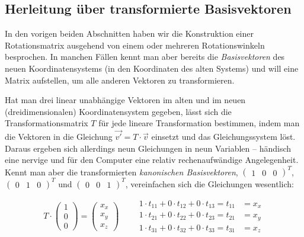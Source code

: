 \subsection{Herleitung über transformierte Basisvektoren}
\label{rotationbasevectors}
In den vorigen beiden Abschnitten haben wir die Konstruktion einer Rotationsmatrix ausgehend von einem oder mehreren Rotationswinkeln besprochen. In manchen Fällen kennt man aber bereits die \emph{Basisvektoren} des neuen Koordinatensystems (in den Koordinaten des alten Systems) und will eine Matrix aufstellen, um alle anderen Vektoren zu transformieren.

Hat man drei linear unabhängige Vektoren im alten und im neuen (dreidimensionalen) Koordinatensystem gegeben, lässt sich die Transformationsmatrix $T$ für jede lineare Transformation bestimmen, indem man die Vektoren in die Gleichung $\vec{v'} = T \cdot \vec v$ einsetzt und das Gleichungssystem löst. Daraus ergeben sich allerdings neun Gleichungen in neun Variablen -- händisch eine nervige und für den Computer eine relativ rechenaufwändige Angelegenheit. Kennt man aber die transformierten \emph{kanonischen Basisvektoren}, $\begin{pmatrix} 1 & 0 & 0 \end{pmatrix}^T$, $\begin{pmatrix} 0 & 1 & 0 \end{pmatrix}^T$ und $\begin{pmatrix} 0 & 0 & 1 \end{pmatrix}^T$, vereinfachen sich die Gleichungen wesentlich:

\begin{equation}
 T \cdot \begin{pmatrix} 1 \\ 0 \\ 0 \end{pmatrix} = \begin{pmatrix} x_x \\ x_y \\ x_z \end{pmatrix} \qquad 
\begin{aligned}
 1 \cdot t_{11} + 0 \cdot t_{12} + 0 \cdot t_{13} = t_{11} &= x_x \\
 1 \cdot t_{21} + 0 \cdot t_{22} + 0 \cdot t_{23} = t_{21} &= x_y \\
 1 \cdot t_{31} + 0 \cdot t_{32} + 0 \cdot t_{33} = t_{31} &= x_z
\end{aligned}
\end{equation}

